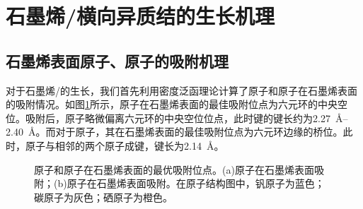 \section{石墨烯/横向异质结的生长机理}
    \subsection{石墨烯表面原子、原子的吸附机理}
    \label{cap:VS}
    对于石墨烯/的生长，我们首先利用密度泛函理论计算了原子和原子在石墨烯表面的吸附情况。如图\ref{fig:VS_VandSeOnG}所示，原子在石墨烯表面的最佳吸附位点为六元环的中央空位。吸附后，原子略微偏离六元环的中央空位位点，此时键的键长约为\SIrange[range-phrase=$\sim$]{2.27}{2.40}{\angstrom}。而对于原子，其在石墨烯表面的最佳吸附位点为六元环边缘的桥位。此时，原子与相邻的两个原子成键，键长为\SI{2.14}{\angstrom}。

    \begin{figure}[htb]
        \caption{原子和原子在石墨烯表面的最优吸附位点。(a)原子在石墨烯表面吸附；(b)原子在石墨烯表面吸附。在原子结构图中，钒原子为蓝色；碳原子为灰色；硒原子为橙色。}
        \label{fig:VS_VandSeOnG}
    \end{figure}

